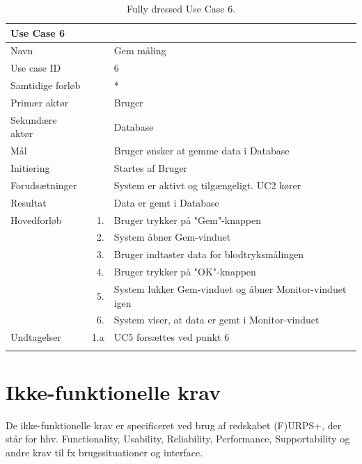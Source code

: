 \begin{longtabu} to  %
    {\large \textbf{Use Case 6}} && \\
    \toprule
    Navn &&    Gem måling\\
    Use case ID &&    6\\
    Samtidige forløb &&   *\\
    Primær aktør &&    Bruger\\
    Sekundære aktør &&	Database\\
    Mål &&    Bruger ønsker at gemme data i Database\\
    Initiering &&	Startes af Bruger\\
    Forudsætninger &&  System er aktivt og tilgængeligt. UC2 kører  \\
    Resultat &&		Data er gemt i Database                 \\ \midrule
    Hovedforløb &    1. &    Bruger trykker på "Gem"\--knappen \\	
                &    2. &    System åbner Gem-vinduet\\[-1ex]
                &    3.	&	 Bruger indtaster data for blodtryksmålingen \\[-1ex]
                &	 4. &    Bruger trykker på "OK"\--knappen  \\[-1ex]
                &	 5.	&	 System lukker Gem-vinduet og åbner Monitor-vinduet igen\\[-1ex]
                &	 6.	&	 System viser, at data er gemt i Monitor-vinduet\newline
                
                \\ \midrule
                
    Undtagelser &   1.a  &  UC5 forsættes ved punkt 6    \\ \bottomrule
\caption{Fully dressed Use Case 6.}
\label{UC6}
\end{longtabu}


\section{Ikke-funktionelle krav}
De ikke-funktionelle krav er specificeret ved brug af redskabet (F)URPS+, der står for hhv. Functionality, Usability, Reliability, Performance, Supportability og andre krav til fx brugssituationer og interface.  


